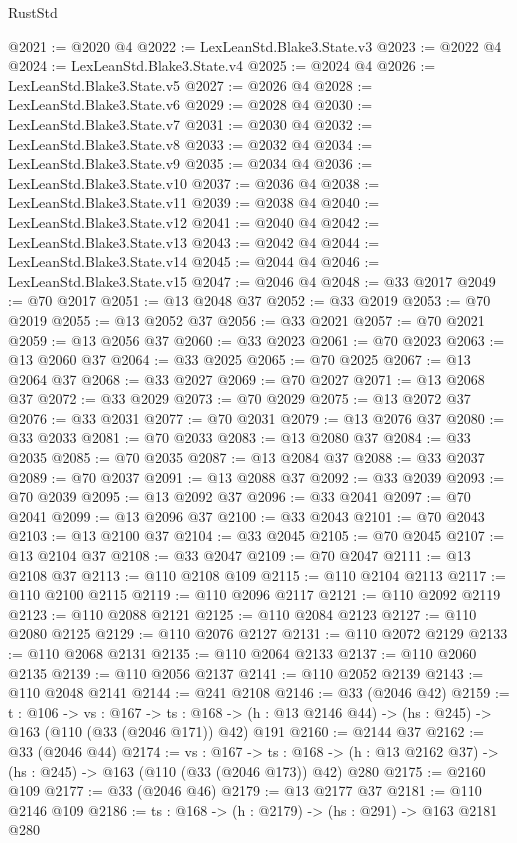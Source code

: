 \begin{lexlean}{RustStd}
\begin{coremodule}
{\begin{coremodule}
{{{{{@2021 := @2020 @4
@2022 := LexLeanStd.Blake3.State.v3
@2023 := @2022 @4
@2024 := LexLeanStd.Blake3.State.v4
@2025 := @2024 @4
@2026 := LexLeanStd.Blake3.State.v5
@2027 := @2026 @4
@2028 := LexLeanStd.Blake3.State.v6
@2029 := @2028 @4
@2030 := LexLeanStd.Blake3.State.v7
@2031 := @2030 @4
@2032 := LexLeanStd.Blake3.State.v8
@2033 := @2032 @4
@2034 := LexLeanStd.Blake3.State.v9
@2035 := @2034 @4
@2036 := LexLeanStd.Blake3.State.v10
@2037 := @2036 @4
@2038 := LexLeanStd.Blake3.State.v11
@2039 := @2038 @4
@2040 := LexLeanStd.Blake3.State.v12
@2041 := @2040 @4
@2042 := LexLeanStd.Blake3.State.v13
@2043 := @2042 @4
@2044 := LexLeanStd.Blake3.State.v14
@2045 := @2044 @4
@2046 := LexLeanStd.Blake3.State.v15
@2047 := @2046 @4
@2048 := @33 @2017
@2049 := @70 @2017
@2051 := @13 @2048 @37
@2052 := @33 @2019
@2053 := @70 @2019
@2055 := @13 @2052 @37
@2056 := @33 @2021
@2057 := @70 @2021
@2059 := @13 @2056 @37
@2060 := @33 @2023
@2061 := @70 @2023
@2063 := @13 @2060 @37
@2064 := @33 @2025
@2065 := @70 @2025
@2067 := @13 @2064 @37
@2068 := @33 @2027
@2069 := @70 @2027
@2071 := @13 @2068 @37
@2072 := @33 @2029
@2073 := @70 @2029
@2075 := @13 @2072 @37
@2076 := @33 @2031
@2077 := @70 @2031
@2079 := @13 @2076 @37
@2080 := @33 @2033
@2081 := @70 @2033
@2083 := @13 @2080 @37
@2084 := @33 @2035
@2085 := @70 @2035
@2087 := @13 @2084 @37
@2088 := @33 @2037
@2089 := @70 @2037
@2091 := @13 @2088 @37
@2092 := @33 @2039
@2093 := @70 @2039
@2095 := @13 @2092 @37
@2096 := @33 @2041
@2097 := @70 @2041
@2099 := @13 @2096 @37
@2100 := @33 @2043
@2101 := @70 @2043
@2103 := @13 @2100 @37
@2104 := @33 @2045
@2105 := @70 @2045
@2107 := @13 @2104 @37
@2108 := @33 @2047
@2109 := @70 @2047
@2111 := @13 @2108 @37
@2113 := @110 @2108 @109
@2115 := @110 @2104 @2113
@2117 := @110 @2100 @2115
@2119 := @110 @2096 @2117
@2121 := @110 @2092 @2119
@2123 := @110 @2088 @2121
@2125 := @110 @2084 @2123
@2127 := @110 @2080 @2125
@2129 := @110 @2076 @2127
@2131 := @110 @2072 @2129
@2133 := @110 @2068 @2131
@2135 := @110 @2064 @2133
@2137 := @110 @2060 @2135
@2139 := @110 @2056 @2137
@2141 := @110 @2052 @2139
@2143 := @110 @2048 @2141
@2144 := @241 @2108
@2146 := @33 (@2046 @42)
@2159 := {t : @106} ->
  {vs : @167} ->
  {ts : @168} -> (h : @13 @2146 @44) -> (hs : @245) -> @163 (@110 (@33 (@2046 @171)) @42) @191
@2160 := @2144 @37
@2162 := @33 (@2046 @44)
@2174 := {vs : @167} ->
  {ts : @168} -> (h : @13 @2162 @37) -> (hs : @245) -> @163 (@110 (@33 (@2046 @173)) @42) @280
@2175 := @2160 @109
@2177 := @33 (@2046 @46)
@2179 := @13 @2177 @37
@2181 := @110 @2146 @109
@2186 := {ts : @168} -> (h : @2179) -> (hs : @291) -> @163 @2181 @280
}}}}}
\end{coremodule}}
\end{coremodule}
\end{lexlean}
